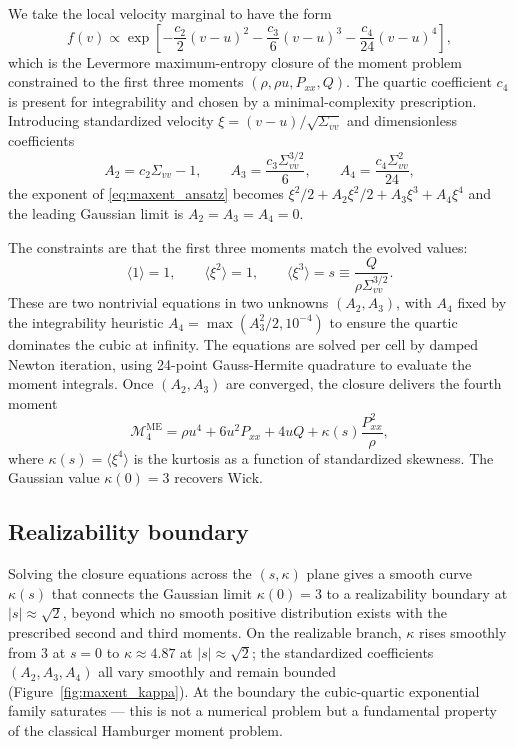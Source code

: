 \documentclass[11pt,letterpaper]{article}
\begin{document}
We take the local velocity marginal to have the form
\begin{equation}
f(v) \propto \exp\!\left[-\frac{c_2}{2}(v - u)^2 - \frac{c_3}{6}(v - u)^3 - \frac{c_4}{24}(v - u)^4\right],
\label{eq:maxent_ansatz}
\end{equation}
which is the Levermore maximum-entropy closure of the moment problem constrained to the first three moments $(\rho, \rho u, P_{xx}, Q)$. The quartic coefficient $c_4$ is present for integrability and chosen by a minimal-complexity prescription. Introducing standardized velocity $\xi = (v - u)/\sqrt{\Sigma_{vv}}$ and dimensionless coefficients
\begin{equation}
A_2 = c_2 \Sigma_{vv} - 1, \qquad A_3 = \frac{c_3 \Sigma_{vv}^{3/2}}{6}, \qquad A_4 = \frac{c_4 \Sigma_{vv}^2}{24},
\end{equation}
the exponent of \eqref{eq:maxent_ansatz} becomes $\xi^2/2 + A_2 \xi^2/2 + A_3 \xi^3 + A_4 \xi^4$ and the leading Gaussian limit is $A_2 = A_3 = A_4 = 0$.

The constraints are that the first three moments match the evolved values:
\begin{equation}
\langle 1 \rangle = 1, \qquad \langle \xi^2 \rangle = 1, \qquad \langle \xi^3 \rangle = s \equiv \frac{Q}{\rho \Sigma_{vv}^{3/2}}.
\end{equation}
These are two nontrivial equations in two unknowns $(A_2, A_3)$, with $A_4$ fixed by the integrability heuristic $A_4 = \max(A_3^2/2, 10^{-4})$ to ensure the quartic dominates the cubic at infinity. The equations are solved per cell by damped Newton iteration, using 24-point Gauss-Hermite quadrature to evaluate the moment integrals. Once $(A_2, A_3)$ are converged, the closure delivers the fourth moment
\begin{equation}
\mathcal{M}_4^{\mathrm{ME}} = \rho u^4 + 6 u^2 P_{xx} + 4 u Q + \kappa(s) \frac{P_{xx}^2}{\rho},
\end{equation}
where $\kappa(s) = \langle \xi^4 \rangle$ is the kurtosis as a function of standardized skewness. The Gaussian value $\kappa(0) = 3$ recovers Wick.

\subsection{Realizability boundary}

Solving the closure equations across the $(s, \kappa)$ plane gives a smooth curve $\kappa(s)$ that connects the Gaussian limit $\kappa(0) = 3$ to a realizability boundary at $|s| \approx \sqrt{2}$, beyond which no smooth positive distribution exists with the prescribed second and third moments. On the realizable branch, $\kappa$ rises smoothly from 3 at $s = 0$ to $\kappa \approx 4.87$ at $|s| \approx \sqrt{2}$; the standardized coefficients $(A_2, A_3, A_4)$ all vary smoothly and remain bounded (Figure~\ref{fig:maxent_kappa}). At the boundary the cubic-quartic exponential family saturates --- this is not a numerical problem but a fundamental property of the classical Hamburger moment problem.
\end{document}
